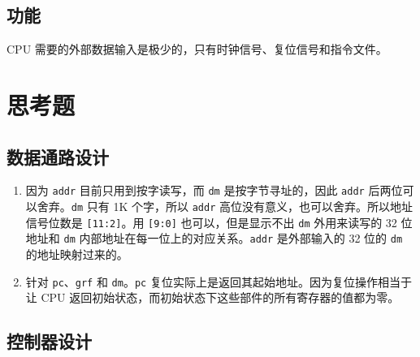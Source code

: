 \documentclass[12pt,AutoFakeBold]{article}
\begin{document}
\hypertarget{ux529fux80fd-14}{%
\subsection{功能}\label{ux529fux80fd-14}}

CPU 需要的外部数据输入是极少的，只有时钟信号、复位信号和指令文件。

\section{思考题}

\subsection{数据通路设计}

\begin{enumerate}
\item 因为 \texttt{addr} 目前只用到按字读写，而 \texttt{dm} 是按字节寻址的，因此 \texttt{addr} 后两位可以舍弃。\texttt{dm} 只有 1K 个字，所以 \texttt{addr} 高位没有意义，也可以舍弃。所以地址信号位数是 \texttt{[11:2]}。用 \texttt{[9:0]} 也可以，但是显示不出 \texttt{dm} 外用来读写的 32 位地址和 \texttt{dm} 内部地址在每一位上的对应关系。\texttt{addr} 是外部输入的 32 位的 \texttt{dm} 的地址映射过来的。
\item 针对 \texttt{pc}、\texttt{grf} 和 \texttt{dm}。\texttt{pc} 复位实际上是返回其起始地址。因为复位操作相当于让 CPU 返回初始状态，而初始状态下这些部件的所有寄存器的值都为零。
\end{enumerate}

\subsection{控制器设计}
\end{document}
